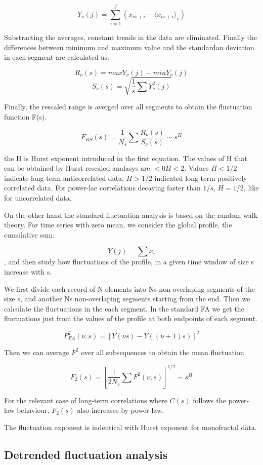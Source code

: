 $$Y_\nu(j) = \sum_{i=1}^{j} (x_{\nu s +i} - \langle x_{\nu s + i } \rangle _s)$$

Substracting the averages, constant trends in the data are eliminated. Finally the differences between minimum and maximum value and the standardan deviation in each segment are calculated as:

$$R_{\nu}(s) = max Y_\nu(j) - min Y_{\nu}(j)$$
$$S_{\nu}(s) = \sqrt{\frac{1}{s}\sum Y^2_{\nu}(j)}$$

Finally, the rescaled range is averged over all segments to obtain the fluctuation function F(s).

$$F_{RS}(s) = \frac{1}{N_s}\sum \frac{R_{\nu}(s)}{S_{\nu}(s)} \sim s^H$$

the H is Hurst exponent introduced in the first equation. The values of H that can be obtained by Hurst rescaled analasys are $<0H<2$. Values $H<1/2$ indicate long-term anticorrelated data, $H>1/2$ indicated long-term positively correlated data. For power-lae correlations decaying faster than $1/s$, $H=1/2$, like for uncorrelated data. 

On the other hand the standard fluctuation analysis is based on the random walk theory. For time series with zero mean, we consider the global profile, the cumulative sum:

$$Y(j) = \sum x_i$$, 
and then study how fluctuations of the profile, in a given time window of size s increase with s. 

We first divide each record of N elements into Ns non-overlaping segments of the size s, and another Ns non-overlaping segments starting from the end. Then we calculate the fluctuations in the each segment. In the standard FA we get the fluctuations just from the values of the profile at both endpoints of each segment. 

$$ F_{FA}^2(\nu, s) = [Y(\nu s) - Y((\nu +1)s)]^2$$ 

Then we can average $F^2$ over all subsequences to obtain the mean fluctuation 

$$F_2(s) = [\frac{1}{2N_s} \sum F^2(\nu,s)]^{1/2}  \sim s^H$$

For the relevant case of long-term correlations where $C(s)$ follows the power-law behaviour, $F_2(s)$ also increases by power-law. 

The fluctuation exponent is indentical with Hurst exponent for monofractal data. 

\subsection{Detrended fluctuation analysis}

